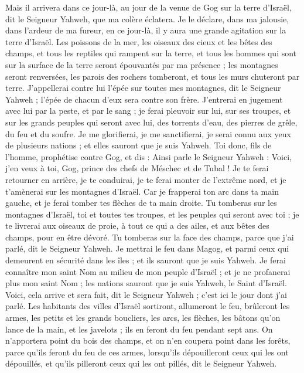 \begin{multicols}{2}
Mais il arrivera dans ce jour-là, au jour de la venue de Gog sur la terre d'Israël, dit le Seigneur Yahweh, que ma colère éclatera.
Je le déclare, dans ma jalousie, dans l'ardeur de ma fureur, en ce jour-là, il y aura une grande agitation sur la terre d'Israël.
Les poissons de la mer, les oiseaux des cieux et les bêtes des champs, et tous les reptiles qui rampent sur la terre, et tous les hommes qui sont sur la surface de la terre seront épouvantés par ma présence ; les montagnes seront renversées, les parois des rochers tomberont, et tous les murs chuteront par terre.
J'appellerai contre lui l'épée sur toutes mes montagnes, dit le Seigneur Yahweh ; l'épée de chacun d'eux sera contre son frère.
J'entrerai en jugement avec lui par la peste, et par le sang ; je ferai pleuvoir sur lui, sur ses troupes, et sur les grands peuples qui seront avec lui, des torrents d'eau, des pierres de grêle, du feu et du soufre.
Je me glorifierai, je me sanctifierai, je serai connu aux yeux de plusieurs nations ; et elles sauront que je suis Yahweh.
\VerseOne{}Toi donc, fils de l'homme, prophétise contre Gog, et dis : Ainsi parle le Seigneur Yahweh : Voici, j'en veux à toi, Gog, prince des chefs de Méschec et de Tubal !
Je te ferai retourner en arrière, je te conduirai, je te ferai monter de l'extrême nord, et je t'amènerai sur les montagnes d'Israël.
Car je frapperai ton arc dans ta main gauche, et je ferai tomber tes flèches de ta main droite.
Tu tomberas sur les montagnes d'Israël, toi et toutes tes troupes, et les peuples qui seront avec toi ; je te livrerai aux oiseaux de proie, à tout ce qui a des ailes, et aux bêtes des champs, pour en être dévoré.
Tu tomberas sur la face des champs, parce que j'ai parlé, dit le Seigneur Yahweh.
Je mettrai le feu dans Magog, et parmi ceux qui demeurent en sécurité dans les îles ; et ils sauront que je suis Yahweh.
Je ferai connaître mon saint Nom au milieu de mon peuple d'Israël ; et je ne profanerai plus mon saint Nom ; les nations sauront que je suis Yahweh, le Saint d'Israël.
Voici, cela arrive et sera fait, dit le Seigneur Yahweh ; c'est ici le jour dont j'ai parlé.
Les habitants des villes d'Israël sortiront, allumeront le feu, brûleront les armes, les petits et les grands boucliers, les arcs, les flèches, les bâtons qu'on lance de la main, et les javelots ; ils en feront du feu pendant sept ans.
On n'apportera point du bois des champs, et on n'en coupera point dans les forêts, parce qu'ils feront du feu de ces armes, lorsqu'ils dépouilleront ceux qui les ont dépouillés, et qu'ils pilleront ceux qui les ont pillés, dit le Seigneur Yahweh.

\end{multicols}
